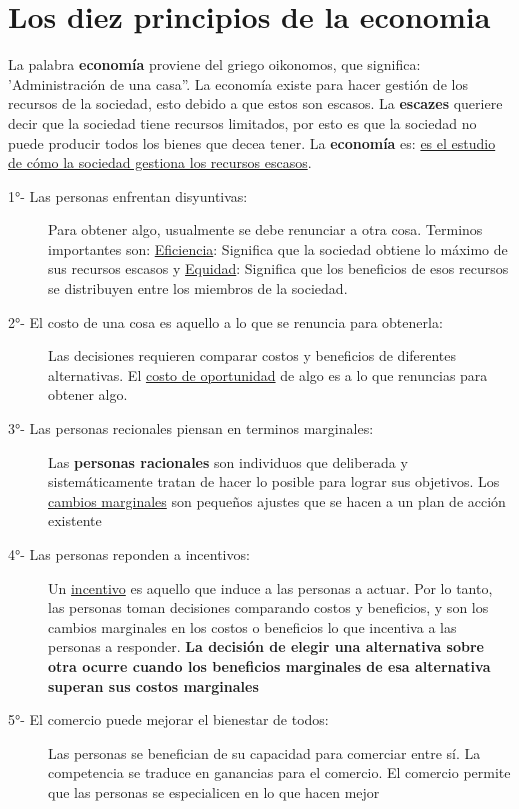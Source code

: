 \section{Los diez principios de la economia}

La palabra \textbf{economía} proviene del griego oikonomos, que significa: 'Administración de una casa''. 
La economía existe para hacer gestión de los recursos de la sociedad, esto debido a que estos son escasos. 
La \textbf{escazes} queriere decir que la sociedad tiene recursos limitados, por esto es que la sociedad no puede
producir todos los bienes que decea tener. La {\bf economía} es: \underline{es el estudio de cómo la sociedad gestiona los recursos escasos}.


\begin{description}
  \item [\large 1°- Las personas enfrentan disyuntivas:] Para obtener algo, usualmente se debe renunciar a otra cosa. Terminos importantes son: \underline{Eficiencia}: Significa que la sociedad obtiene lo máximo de sus recursos escasos y \underline{Equidad}: Significa que los beneficios de esos recursos se distribuyen entre los miembros de la sociedad.
  \item [\large 2°- El costo de una cosa es aquello a lo que se renuncia para obtenerla:] Las decisiones requieren comparar costos y beneficios de diferentes alternativas. El \underline{costo de oportunidad} de algo es a lo que renuncias para obtener algo.
  \item [\large 3°- Las personas recionales piensan en terminos marginales:] Las {\bf personas racionales} son individuos que deliberada y sistemáticamente tratan de hacer lo posible para lograr sus objetivos. Los \underline{cambios marginales} son pequeños ajustes que se hacen a un plan de acción existente
  \item [\large 4°- Las personas reponden a incentivos:] Un \underline{incentivo} es aquello que induce a las personas a actuar. Por lo tanto, las personas toman decisiones comparando costos y beneficios, y son los cambios marginales en los costos o beneficios lo que incentiva a las personas a responder. {\bf La decisión de elegir una alternativa sobre otra ocurre cuando los beneficios marginales de esa alternativa superan sus costos marginales}
  \item [\large 5°- El comercio puede mejorar el bienestar de todos:] Las personas se benefician de su capacidad para comerciar entre sí. La competencia se traduce en ganancias para el comercio. El comercio permite que las personas se especialicen en lo que hacen mejor

\end{description}
